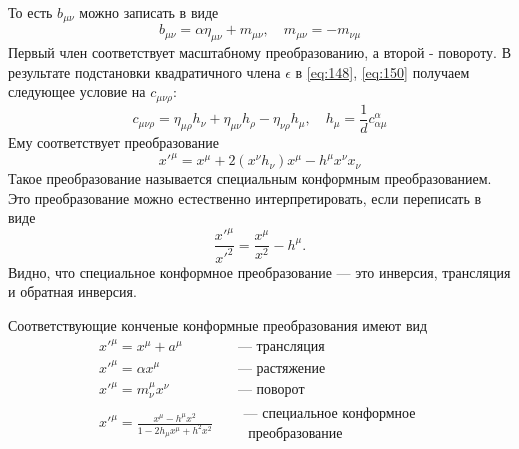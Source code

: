 \documentclass[a4paper,12pt]{article}
\theoremstyle{definition}
\theoremstyle{definition}
\theoremstyle{definition}
\begin{document}
То есть $b_{\mu\nu}$ можно записать в виде
\begin{equation}
  \label{eq:159}
  b_{\mu\nu}=\alpha \eta_{\mu\nu} +m_{\mu\nu},\quad m_{\mu\nu}=-m_{\nu\mu}
\end{equation}
Первый член соответствует масштабному преобразованию, а второй - повороту. 
В результате подстановки квадратичного члена $\epsilon$ в \eqref{eq:148}, \eqref{eq:150} получаем
следующее условие на $c_{\mu\nu\rho}$: 
\begin{equation}
  \label{eq:160}
  c_{\mu\nu\rho}=\eta_{\mu\rho} h_{\nu} +\eta_{\mu\nu}h_{\rho}-\eta_{\nu\rho}h_{\mu}, \quad h_{\mu}=\frac{1}{d} c^{\alpha}_{\alpha\mu}
\end{equation}
Ему соответствует преобразование
\begin{equation}
  \label{eq:161}
  x'^{\mu}=x^{\mu}+2 (x^{\nu}h_{\nu})x^{\mu} -h^{\mu} x^{\nu}x_{\nu}
\end{equation}
Такое преобразование называется специальным конформным преобразованием.
Это преобразование можно естественно интерпретировать, если переписать в виде
\begin{equation}
  \label{eq:162}
  \frac{x'^{\mu}}{x'^2}=\frac{x^{\mu}}{x^2}-h^{\mu}.
\end{equation}
Видно, что специальное конформное преобразование --- это инверсия, трансляция и обратная инверсия.  

Соответствующие конченые конформные преобразования имеют вид
\begin{eqnarray}
  \label{eq:163}
  x'^{\mu}=x^{\mu}+a^{\mu}&\quad \mbox{--- трансляция}\\
  x'^{\mu}=\alpha x^{\mu} &\quad \mbox{--- растяжение}\\
  x'^{\mu}=m^{\mu}_{\nu} x^{\nu} &\quad \mbox{--- поворот}\\
  x'^{\mu}=\frac{x^{\mu}-h^{\mu}x^2}{1-2h_{\mu}x^{\mu}+h^2 x^2}  & \quad \begin{array}{c}\mbox{--- специальное конформное}\\ \mbox{ преобразование}\end{array}
\end{eqnarray}
\end{document}
